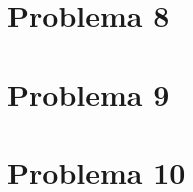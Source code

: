 \color{black}
	



	\section{Problema 8}
\color{blue}

\color{black}
	



	\section{Problema 9}
\color{blue}

\color{black}
	



	\section{Problema 10}
\color{blue}

\color{black}
	


